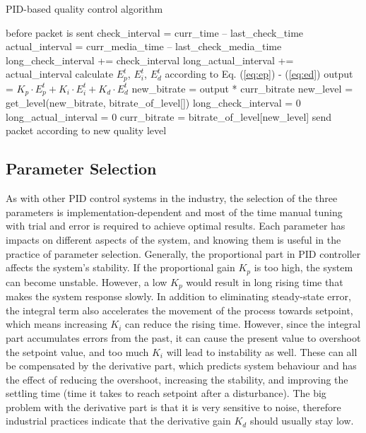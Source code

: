 \documentclass[journal]{IEEEtran}
\begin{document}
\begin{algorithm}
\caption{PID-based quality control algorithm}
\label{algo:control}
\begin{algorithmic}
    \STATE before packet is sent
    \STATE check\_interval = curr\_time -- last\_check\_time
    \STATE actual\_interval = curr\_media\_time -- last\_check\_media\_time
    \STATE long\_check\_interval += check\_interval
    \STATE long\_actual\_interval += actual\_interval
    \STATE calculate $E_p^t$, $E_i^t$, $E_d^t$ according to Eq. (\ref{eq:ep}) - (\ref{eq:ed})
    \STATE output = ${K_p} \cdot E_p^t + {K_i} \cdot E_i^t + {K_d} \cdot E_d^t$
    \STATE new\_bitrate = output * curr\_bitrate
    \STATE new\_level = get\_level(new\_bitrate, bitrate\_of\_level[])
    	\STATE long\_check\_interval = 0
    	\STATE long\_actual\_interval = 0
    	\STATE curr\_bitrate = bitrate\_of\_level[new\_level]
    \ENDIF
    \STATE send packet according to new quality level
\end{algorithmic}
\end{algorithm}


\subsection{Parameter Selection}
\label{subsec:parameter-selection}

As with other PID control systems in the industry, the selection of the three parameters is implementation-dependent and most of the time manual tuning with trial and error is required to achieve optimal results. Each parameter has impacts on different aspects of the system, and knowing them is useful in the practice of parameter selection. Generally, the proportional part in PID controller affects the system's stability. If the proportional gain $K_p$ is too high, the system can become unstable. However, a low $K_p$ would result in long rising time that makes the system response slowly. In addition to eliminating steady-state error, the integral term also accelerates the movement of the process towards setpoint, which means increasing $K_i$ can reduce the rising time. However, since the integral part accumulates errors from the past, it can cause the present value to overshoot the setpoint value, and too much $K_i$ will lead to instability as well. These can all be compensated by the derivative part, which predicts system behaviour and has the effect of reducing the overshoot, increasing the stability, and improving the settling time (time it takes to reach setpoint after a disturbance). The big problem with the derivative part is that it is very sensitive to noise, therefore industrial practices indicate that the derivative gain $K_d$ should usually stay low.
\end{document}
